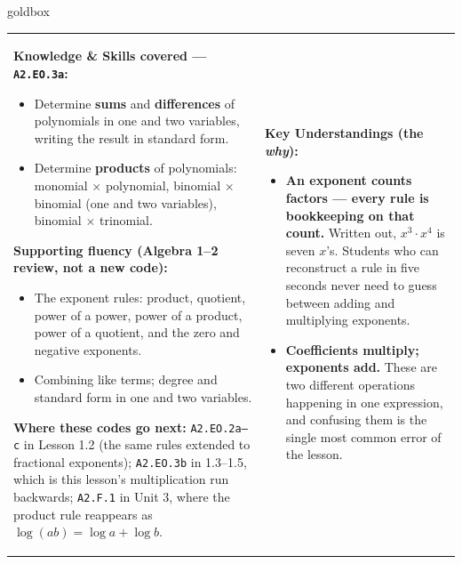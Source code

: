 \documentclass[10pt]{article}
\begin{document}
\renewcommand{\arraystretch}{1.6}
\begin{skillbox}{goldbox}
\begin{tabularx}{\linewidth}{@{}X|X@{}}
\begin{minipage}[t]{\linewidth}\vspace{0pt}
\textbf{Knowledge \& Skills covered --- \texttt{A2.EO.3a}:}
\begin{itemize}[leftmargin=1.1em, itemsep=2pt, topsep=2pt]
  \item Determine \textbf{sums} and \textbf{differences} of polynomials in one and two variables,
        writing the result in standard form.
  \item Determine \textbf{products} of polynomials: monomial $\times$ polynomial, binomial
        $\times$ binomial (one and two variables), binomial $\times$ trinomial.
\end{itemize}
\textbf{Supporting fluency (Algebra 1--2 review, not a new code):}
\begin{itemize}[leftmargin=1.1em, itemsep=2pt, topsep=2pt]
  \item The exponent rules: product, quotient, power of a power, power of a product, power of a
        quotient, and the zero and negative exponents.
  \item Combining like terms; degree and standard form in one and two variables.
\end{itemize}
\textbf{Where these codes go next:} \texttt{A2.EO.2a--c} in Lesson 1.2 (the same rules extended
to fractional exponents); \texttt{A2.EO.3b} in 1.3--1.5, which is this lesson's multiplication
run backwards; \texttt{A2.F.1} in Unit 3, where the product rule reappears as
$\log(ab)=\log a+\log b$.
\end{minipage}
&
\begin{minipage}[t]{\linewidth}\vspace{0pt}
\textbf{Key Understandings (the \emph{why}):}
\begin{itemize}[leftmargin=1.1em, itemsep=2pt, topsep=2pt]
  \item \textbf{An exponent counts factors --- every rule is bookkeeping on that count.} Written
        out, $x^3\cdot x^4$ is seven $x$'s. Students who can reconstruct a rule in five seconds
        never need to guess between adding and multiplying exponents.
  \item \textbf{Coefficients multiply; exponents add.} These are two different operations happening
        in one expression, and confusing them is the single most common error of the lesson.

\end{itemize}
\end{minipage}
\end{tabularx}
\end{skillbox}
\end{document}
